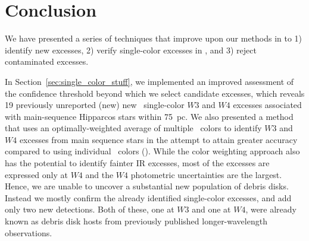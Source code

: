    
\section{Conclusion}
\label{sec:conclusion}


    We have presented a series of techniques that improve upon our methods in  to 1) identify new excesses, 2) verify single-color excesses in \WS, and 3) reject contaminated excesses. 
    
    In Section~\ref{sec:single_color_stuff}, we implemented an improved assessment of the confidence threshold beyond which we select candidate excesses, which reveals 19 previously unreported (new) new \WS\ single-color $W3$ and $W4$ excesses associated with main-sequence Hipparcos stars within 75~pc. We also presented a method that uses an optimally-weighted average of multiple \WS\ colors to identify $W3$ and $W4$ excesses from main sequence stars in the attempt to attain greater accuracy compared to using individual \WS\ colors (). While the color weighting approach also has the potential to identify fainter IR excesses, most of the excesses are expressed only at $W4$ and the $W4$ photometric uncertainties are the largest. Hence, we are unable to uncover a substantial new population of debris disks. Instead we mostly confirm the already identified single-color excesses, and add only two new detections. Both of these, one at $W3$ and one at $W4$, were already known as debris disk hosts from previously published longer-wavelength observations.
    
    
